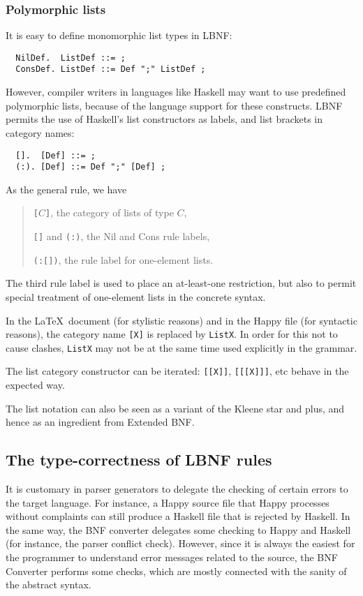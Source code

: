 \documentclass[10pt]{article}
\newcommand{\bequ}{\begin{quote}}
\newcommand{\enqu}{\end{quote}}
\begin{document}
\subsubsection{Polymorphic lists}

It is easy to define monomorphic list types in LBNF:
\begin{verbatim}
  NilDef.  ListDef ::= ;
  ConsDef. ListDef ::= Def ";" ListDef ;
\end{verbatim}
However, compiler writers in languages like
Haskell may want to use predefined 
polymorphic lists, because of the language support for these constructs. 
LBNF permits the use of Haskell's list constructors
as labels, and list brackets in category names:
\begin{verbatim}
  [].  [Def] ::= ;
  (:). [Def] ::= Def ";" [Def] ;
\end{verbatim}
As the general rule, we have
\bequ
{\tt[}$C${\tt ]}, the category of lists of type $C$,
 
{\tt []} and {\tt (:)}, the Nil and Cons rule labels,

{\tt (:[])}, the rule label for one-element lists. 
\enqu
The third rule label is used to place an at-least-one restriction,
but also to permit special treatment of one-element lists
in the concrete syntax. 

In the \LaTeX\ document (for stylistic reasons) and in the Happy file (for 
syntactic reasons), the category name {\tt [X]} is replaced by {\tt ListX}. 
In order for this not to cause clashes, {\tt ListX} 
may not be at the same time used explicitly in the grammar.

The list category constructor can be iterated: {\tt [[X]]}, {\tt [[[X]]]}, etc
behave in the expected way.

The list notation can also be seen as a variant of the Kleene star and plus, and 
hence as an ingredient from Extended BNF.




\subsection{The type-correctness of LBNF rules}

\label{typecheck}

It is customary in parser generators to delegate the checking of certain
errors to the target language. For instance, a Happy source file that
Happy processes without complaints can still produce a Haskell file
that is rejected by Haskell. In the same way, the BNF converter
delegates some checking to Happy and Haskell (for instance,
the parser conflict check). However, since it is always
the easiest for the programmer to understand error messages
related to the source, the BNF Converter performs some checks,
which are mostly connected with the sanity of the abstract syntax.
\end{document}

